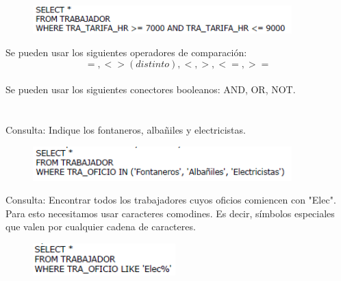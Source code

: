 \documentclass[preprint,12pt]{elsarticle}
\begin{document}
\begin{itemize}
	\begin{figure}[htb]
		\begin{center}
			\includegraphics[width=10cm]{./IMAGENES/consultasimple3}
		\end{center}
	\end{figure}
Se pueden usar los siguientes operadores de comparación: \begin{equation*}=, <> (distinto), <, >, <=, >=\end{equation*}
\\ Se pueden usar los siguientes conectores booleanos: AND, OR, NOT. \\ \\ \\ Consulta: Indique los fontaneros, albañiles y electricistas.
	\begin{figure}[htb]
		\begin{center}
			\includegraphics[width=10cm]{./IMAGENES/consultasimple4}
		\end{center}
	\end{figure}

Consulta: Encontrar todos los trabajadores cuyos oficios comiencen con "Elec". Para esto necesitamos usar caracteres comodines. Es decir, símbolos especiales que valen por cualquier cadena de caracteres.
	\begin{figure}[htb]
		\begin{center}
			\includegraphics[width=5.5cm]{./IMAGENES/consultasimple5}
		\end{center}
	\end{figure}


\end{itemize}
\end{document}
